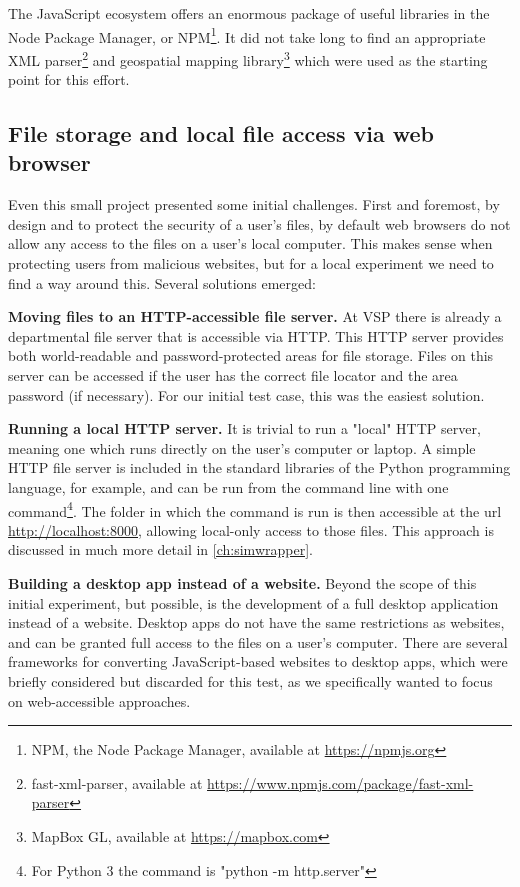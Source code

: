 The JavaScript ecosystem offers an enormous package of useful libraries in the Node Package Manager, or NPM\footnote{NPM, the Node Package Manager, available at \url{https://npmjs.org}}. It did not take long to find an appropriate XML parser\footnote[1]{fast-xml-parser, available at \url{https://www.npmjs.com/package/fast-xml-parser}} and geospatial mapping library\footnote[2]{MapBox GL, available at \url{https://mapbox.com}} which were used as the starting point for this effort.

\hypertarget{server-experiments-files}{%
\subsection{File storage and local file access via web browser}
\label{server-experiments-files}}

Even this small project presented some initial challenges. First and foremost, by design and to protect the security of a user's files, by default web browsers do not allow any access to the files on a user's local computer. This makes sense when protecting users from malicious websites, but for a local experiment we need to find a way around this. Several solutions emerged:

\textbf{Moving files to an HTTP-accessible file server.} At VSP there is already a departmental file server that is accessible via \gls{HTTP}. This HTTP server provides both world-readable and password-protected areas for file storage. Files on this server can be accessed if the user has the correct file locator and the area password (if necessary). For our initial test case, this was the easiest solution.

\textbf{Running a local HTTP server.} It is trivial to run a "local" HTTP server, meaning one which runs directly on the user's computer or laptop. A simple HTTP file server is included in the standard libraries of the Python programming language, for example, and can be run from the command line with one command\footnote{For Python 3 the command is "python -m http.server"}. The folder in which the command is run is then accessible at the url \url{http://localhost:8000}, allowing local-only access to those files. This approach is discussed in much more detail in \autoref{ch:simwrapper}.

\textbf{Building a desktop app instead of a website.} Beyond the scope of this initial experiment, but possible, is the development of a full desktop application instead of a website. Desktop apps do not have the same restrictions as websites, and can be granted full access to the files on a user's computer. There are several frameworks for converting JavaScript-based websites to desktop apps, which were briefly considered but discarded for this test, as we specifically wanted to focus on web-accessible approaches.

